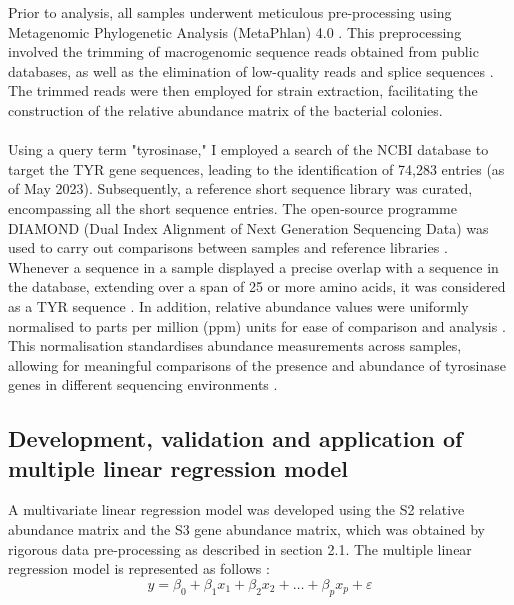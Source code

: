 \documentclass[12pt]{article}
\begin{document}
Prior to analysis, all samples underwent meticulous pre-processing using Metagenomic Phylogenetic Analysis (MetaPhlan) 4.0 \citep{segata2012metagenomic}. This preprocessing involved the trimming of macrogenomic sequence reads obtained from public databases, as well as the elimination of low-quality reads and splice sequences \citep{segata2012metagenomic}. The trimmed reads were then employed for strain extraction, facilitating the construction of the relative abundance matrix of the bacterial colonies.\\\\
Using a query term "tyrosinase," I employed a search of the NCBI database to target the TYR gene sequences, leading to the identification of 74,283 entries (as of May 2023). Subsequently, a reference short sequence library was curated, encompassing all the short sequence entries. The open-source programme DIAMOND (Dual Index Alignment of Next Generation Sequencing Data) was used to carry out comparisons between samples and reference libraries \citep{buchfink2015fast}. Whenever a sequence in a sample displayed a precise overlap with a sequence in the database, extending over a span of 25 or more amino acids, it was considered as a TYR sequence \citep{kristiansson2011pyrosequencing}. In addition, relative abundance values were uniformly normalised to parts per million (ppm) units for ease of comparison and analysis \citep{yang2013exploring}. This normalisation standardises abundance measurements across samples, allowing for meaningful comparisons of the presence and abundance of tyrosinase genes in different sequencing environments \citep{yang2013exploring}.


\subsection{Development, validation and application of multiple linear regression model}

A multivariate linear regression model was developed using the S2 relative abundance matrix and the S3 gene abundance matrix, which was obtained by rigorous data pre-processing as described in section 2.1. The multiple linear regression model is represented as follows \citep{eberly2007multiple}:
\[
y = \beta_0 + \beta_1 x_1 + \beta_2 x_2 + \ldots + \beta_p x_p + \varepsilon
\]
\end{document}
